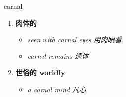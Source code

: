 
\begin{frame}
{\huge carnal}
\begin{center}
\begin{enumerate}\Large
  \item \textbf{肉体的}
  \begin{itemize}
    \item \em{\Large{seen with carnal eyes 用肉眼看}}
    \item \em{\Large{carnal remains 遗体}}
  \end{itemize}
  \item \textbf{世俗的 worldly}
  \begin{itemize}
    \item \em{\Large{a carnal mind 凡心}}
  \end{itemize}
\end{enumerate}
\end{center}
\end{frame}
